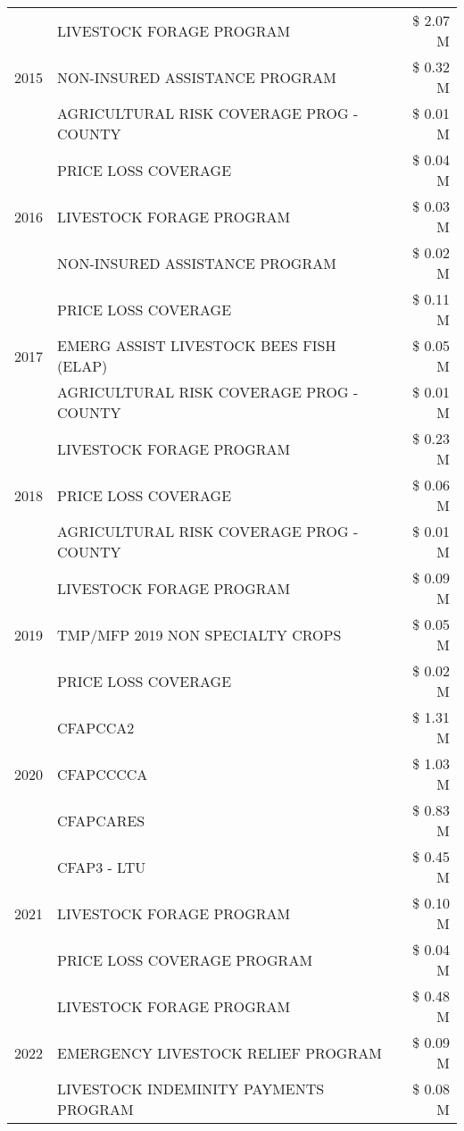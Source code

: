 \begin{tabular}{llr}
\cline{1-3}
\multirow[t]{3}{*}{2015} & LIVESTOCK FORAGE PROGRAM & \$ 2.07 M \\
 & NON-INSURED ASSISTANCE PROGRAM & \$ 0.32 M \\
 & AGRICULTURAL RISK COVERAGE PROG - COUNTY & \$ 0.01 M \\
\cline{1-3}
\multirow[t]{3}{*}{2016} & PRICE LOSS COVERAGE & \$ 0.04 M \\
 & LIVESTOCK FORAGE PROGRAM & \$ 0.03 M \\
 & NON-INSURED ASSISTANCE PROGRAM & \$ 0.02 M \\
\cline{1-3}
\multirow[t]{3}{*}{2017} & PRICE LOSS COVERAGE & \$ 0.11 M \\
 & EMERG ASSIST LIVESTOCK BEES FISH (ELAP) & \$ 0.05 M \\
 & AGRICULTURAL RISK COVERAGE PROG - COUNTY & \$ 0.01 M \\
\cline{1-3}
\multirow[t]{3}{*}{2018} & LIVESTOCK FORAGE PROGRAM & \$ 0.23 M \\
 & PRICE LOSS COVERAGE & \$ 0.06 M \\
 & AGRICULTURAL RISK COVERAGE PROG - COUNTY & \$ 0.01 M \\
\cline{1-3}
\multirow[t]{3}{*}{2019} & LIVESTOCK FORAGE PROGRAM & \$ 0.09 M \\
 & TMP/MFP 2019 NON SPECIALTY CROPS & \$ 0.05 M \\
 & PRICE LOSS COVERAGE & \$ 0.02 M \\
\cline{1-3}
\multirow[t]{3}{*}{2020} & CFAPCCA2 & \$ 1.31 M \\
 & CFAPCCCCA & \$ 1.03 M \\
 & CFAPCARES & \$ 0.83 M \\
\cline{1-3}
\multirow[t]{3}{*}{2021} & CFAP3 - LTU & \$ 0.45 M \\
 & LIVESTOCK FORAGE PROGRAM & \$ 0.10 M \\
 & PRICE LOSS COVERAGE PROGRAM & \$ 0.04 M \\
\cline{1-3}
\multirow[t]{3}{*}{2022} & LIVESTOCK FORAGE PROGRAM & \$ 0.48 M \\
 & EMERGENCY LIVESTOCK RELIEF PROGRAM & \$ 0.09 M \\
 & LIVESTOCK INDEMINITY PAYMENTS PROGRAM & \$ 0.08 M \\
\cline{1-3}
\bottomrule
\end{tabular}
